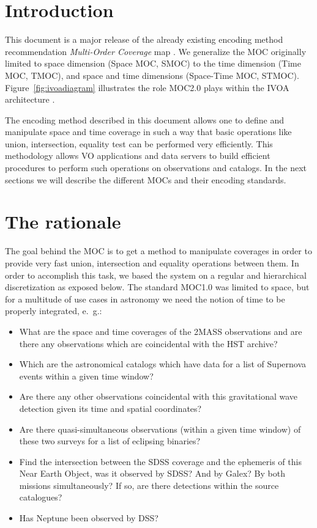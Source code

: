 \documentclass[11pt,a4paper]{ivoa}
\begin{document}
\section{Introduction}
This document is a major release of
the already existing encoding method recommendation \emph{Multi-Order
  Coverage} map \citep[MOC~1.1,][]{2019ivoa.spec.1007F}. We generalize the MOC
originally limited to space dimension (Space MOC, SMOC) to the time
dimension (Time MOC, TMOC), and space and time dimensions (Space-Time
MOC, STMOC). Figure~\ref{fig:ivoadiagram} illustrates the role MOC2.0
plays within the IVOA architecture \citep{2021ivoa.spec.1101D}.

The encoding method described in this document allows one to define
and manipulate space and time coverage in such a way that basic
operations like union, intersection, equality test can be performed
very efficiently. This methodology allows VO applications and
data servers to build efficient
procedures to perform such operations on observations and catalogs. 
In the next sections we will describe the different MOCs and their
encoding standards.

\section{The rationale}
\label{sec:usecases}
The goal behind the MOC is to get a method to manipulate coverages in
order to provide very fast union, intersection and
equality operations between them. In order to accomplish this task, we
based the system on a regular and hierarchical discretization as
exposed below. The standard MOC1.0 was limited to space, but for a
multitude of use cases in astronomy we need the notion of time to be
properly integrated, e.~g.:
\begin{itemize}
\item What are the space and time coverages of the 2MASS observations
  and are there any observations which are coincidental with the HST
  archive?
\item Which are the astronomical catalogs which have data for a list
  of Supernova events within a given time window?
\item Are there any other observations coincidental with this
  gravitational wave detection given its time and spatial coordinates?
\item Are there quasi-simultaneous observations (within a given time
  window) of these two surveys for a list of eclipsing binaries?
\item Find the intersection between the SDSS coverage and the
  ephemeris of this Near Earth Object, was it observed by SDSS? And
  by Galex? By both missions simultaneously? If so, are there
  detections within the source catalogues?
\item Has Neptune been observed by DSS?
\end{itemize}
\end{document}
